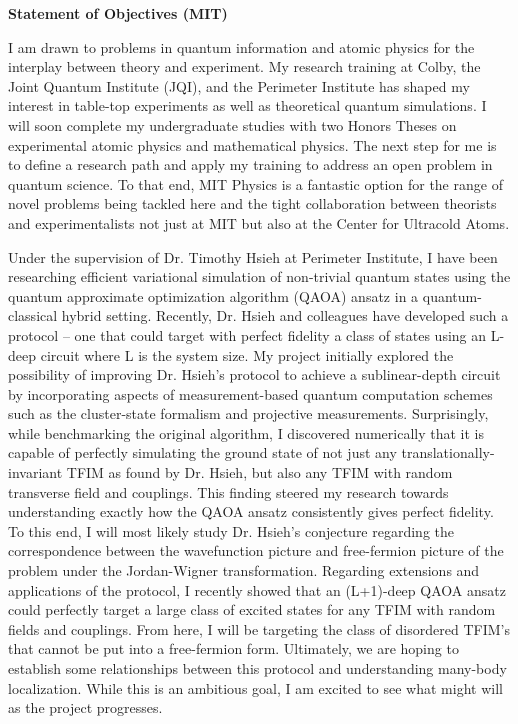\documentclass[12pt]{article}
\begin{document}
	
	
\begin{center}
	\textbf{Statement of Objectives (MIT)}
\end{center}\vspace{-5pt}	
I am drawn to problems in quantum information and atomic physics for the interplay between theory and experiment. My research training at Colby, the Joint Quantum Institute (JQI), and the Perimeter Institute has shaped my interest in table-top experiments as well as theoretical quantum simulations. I will soon complete my undergraduate studies with two Honors Theses on experimental atomic physics and mathematical physics. The next step for me is to define a research path and apply my training to address an open problem in quantum science. To that end, MIT Physics is a fantastic option for the range of novel problems being tackled here and the tight collaboration between theorists and experimentalists not just at MIT but also at the Center for Ultracold Atoms.    \\ \vspace{-10pt}

Under the supervision of Dr. Timothy Hsieh at Perimeter Institute, I have been researching efficient variational simulation of non-trivial quantum states using the quantum approximate optimization algorithm (QAOA) ansatz in a quantum-classical hybrid setting. Recently, Dr. Hsieh and colleagues have developed such a protocol -- one that could target with perfect fidelity a class of states using an L-deep circuit where L is the system size. My project initially explored the possibility of improving Dr. Hsieh's protocol to achieve a sublinear-depth circuit by incorporating aspects of measurement-based quantum computation schemes such as the cluster-state formalism and projective measurements. Surprisingly, while benchmarking the original algorithm, I discovered numerically that it is capable of perfectly simulating the ground state of not just any translationally-invariant TFIM as found by Dr. Hsieh, but also any TFIM with random transverse field and couplings. This finding steered my research towards understanding exactly how the QAOA ansatz consistently gives perfect fidelity. To this end, I will most likely study Dr. Hsieh's conjecture regarding the correspondence between the wavefunction picture and free-fermion picture of the problem under the Jordan-Wigner transformation. Regarding extensions and applications of the protocol, I recently showed that an (L+1)-deep QAOA ansatz could perfectly target a large class of excited states for any TFIM with random fields and couplings. From here, I will be targeting the class of disordered TFIM's that cannot be put into a free-fermion form. Ultimately, we are hoping to establish some relationships between this protocol and understanding many-body localization. While this is an ambitious goal, I am excited to see what might will as the project progresses. \\ \vspace{-10pt}
\end{document}
